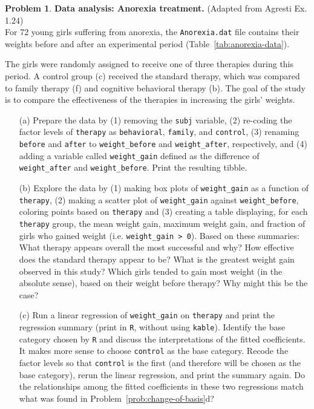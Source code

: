 \documentclass[11pt,letterpaper,english,oneside]{article} %
\theoremstyle{definition} %
\newtheorem{problem}{Problem}
\newenvironment{prob}{\clearpage \begin{problem}\hspace{0pt}}{\end{problem}}
\begin{document}
\begin{prob} \textbf{Data analysis: Anorexia treatment.} (Adapted from Agresti Ex. 1.24) \\

\noindent For 72 young girls suffering from anorexia, the \texttt{Anorexia.dat} file contains their weights before and after an experimental period (Table~\ref{tab:anorexia-data}).



\noindent The girls were randomly assigned to receive one of three therapies during this period. A control group (c) received the standard therapy, which was compared to family therapy (f) and cognitive behavioral therapy (b). The goal of the study is to compare the effectiveness of the therapies in increasing the girls' weights. 

\begin{enumerate}
\item[(a)] Prepare the data by (1) removing the \texttt{subj} variable, (2) re-coding the factor levels of \texttt{therapy} as \texttt{behavioral}, \texttt{family}, and \texttt{control}, (3) renaming \texttt{before} and \texttt{after} to \texttt{weight\_before} and \texttt{weight\_after}, respectively, and (4) adding a variable called \texttt{weight\_gain} defined as the difference of \texttt{weight\_after} and \texttt{weight\_before}. Print the resulting tibble.
\item[(b)] Explore the data by (1) making box plots of \texttt{weight\_gain} as a function of \texttt{therapy}, (2) making a scatter plot of \texttt{weight\_gain} against \texttt{weight\_before}, coloring points based on \texttt{therapy} and (3) creating a table displaying, for each \texttt{therapy} group, the mean weight gain, maximum weight gain, and fraction of girls who gained weight (i.e. \texttt{weight\_gain > 0}). Based on these summaries: What therapy appears overall the most successful and why? How effective does the standard therapy appear to be? What is the greatest weight gain observed in this study? Which girls tended to gain most weight (in the absolute sense), based on their weight before therapy? Why might this be the case? 

\item[(c)] Run a linear regression of \texttt{weight\_gain} on \texttt{therapy} and print the regression summary (print in \texttt{R}, without using \texttt{kable}). Identify the base category chosen by \texttt{R} and discuss the interpretations of the fitted coefficients. It makes more sense to choose \texttt{control} as the base category. Recode the factor levels so that \texttt{control} is the first (and therefore will be chosen as the base category), rerun the linear regression, and print the summary again. Do the relationships among the fitted coefficients in these two regressions match what was found in Problem~\ref{prob:change-of-basis}d? 


\end{enumerate}
\end{prob}
\end{document}
